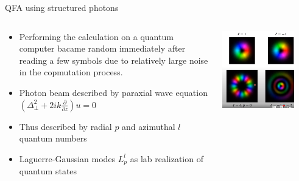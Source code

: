 \documentclass[aspectratio=169,9pt]{beamer}
\begin{document}
\begin{frame}[t]{QFA using structured photons}
  \begin{columns}
    \begin{column}[]{0.5\textwidth}
      \begin{itemize}
        \item Performing the calculation on a quantum computer bacame random immediately after reading a few symbols due to relatively large noise in the copmutation process.
        \vspace*{1em}
        \item Photon beam described by paraxial wave equation $\left(\Delta_\perp^2+2ik\frac{\partial}{\partial z}\right)u=0$
        \item Thus described by radial $p$ and azimuthal $l$ quantum numbers
        \item Laguerre-Gaussian modes $L_p^l$ as lab realization of quantum states
      \end{itemize}
    \end{column}
    \begin{column}[]{0.5\textwidth}
      \includegraphics[width=0.8\textwidth]{LG_modes_structured_photons.png}
    \end{column}
  \end{columns}
\end{frame}
\end{document}
